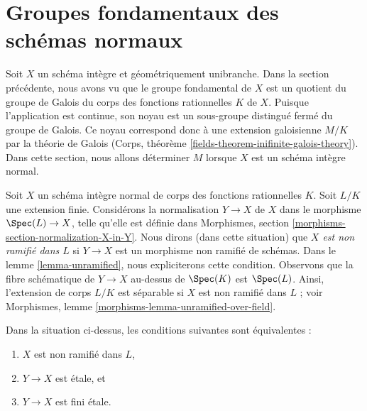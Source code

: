 \section{Groupes fondamentaux des schémas normaux}
\label{section-normal}

\noindent
Soit $X$ un schéma intègre et géométriquement unibranche. Dans la section précédente,
nous avons vu que le groupe fondamental de $X$ est un quotient du
groupe de Galois du corps des fonctions rationnelles $K$ de $X$. Puisque l'application est continue,
son noyau est un sous-groupe distingué fermé du groupe de Galois. Ce noyau
correspond donc à une extension galoisienne $M/K$ par la théorie de Galois
(Corps, théorème \ref{fields-theorem-inifinite-galois-theory}).
Dans cette section, nous allons déterminer $M$ lorsque $X$ est un schéma intègre normal.

\medskip\noindent
Soit $X$ un schéma intègre normal de corps des fonctions rationnelles $K$.
Soit $L/K$ une extension finie. Considérons la normalisation
$Y \to X$ de $X$ dans le morphisme $\Spec(L) \to X$, telle qu'elle est définie dans
Morphismes, section \ref{morphisms-section-normalization-X-in-Y}.
Nous dirons (dans cette situation) que {\it $X$ est non ramifié dans $L$}
si $Y \to X$ est un morphisme non ramifié de schémas. Dans le
lemme \ref{lemma-unramified}, nous expliciterons cette condition.
Observons que la fibre schématique de $Y \to X$ au-dessus de $\Spec(K)$
est $\Spec(L)$. Ainsi, l'extension de corps $L/K$ est séparable si $X$ est
non ramifié dans $L$ ; voir
Morphismes, lemme \ref{morphisms-lemma-unramified-over-field}.

\begin{lemma}
\label{lemma-unramified-in-L}
Dans la situation ci-dessus, les conditions suivantes sont équivalentes :
\begin{enumerate}
\item $X$ est non ramifié dans $L$,
\item $Y \to X$ est étale, et
\item $Y \to X$ est fini étale.
\end{enumerate}
\end{lemma}

